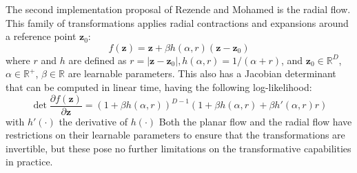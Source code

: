 \documentclass{report}
\newcommand{\R}{\mathbb{R}}
\newcommand{\bz}{\mathbf{z}}
\newcommand{\parfrac}[2]{\frac{\partial #1}{\partial#2}}
\begin{document}
The second implementation proposal of Rezende and Mohamed is the radial flow. This family of transformations applies radial contractions and expansions around a reference point $\bz_0$:
\begin{equation}
    f(\bz) = \bz + \beta h(\alpha, r)(\bz - \bz_0)
\end{equation}
where $r$ and $h$ are defined as $r=|\bz - \bz_0|,  h(\alpha, r) = 1/(\alpha + r)$, and $\bz_0 \in \R^D$, $\alpha \in \R^+$, $\beta \in \R$ are learnable parameters. This also has a Jacobian determinant that can be computed in linear time, having the following log-likelihood:
\begin{equation}
    \det \parfrac{f(\bz)}{\bz}  = (1 + \beta h(\alpha, r))^{D-1} (1 + \beta h(\alpha, r) + \beta h'(\alpha, r)r)
\end{equation}
with $h'(\cdot)$ the derivative of $h(\cdot)$ Both the planar flow and the radial flow have restrictions on their learnable parameters to ensure that the transformations are invertible, but these pose no further limitations on the transformative capabilities in practice.
\end{document}
